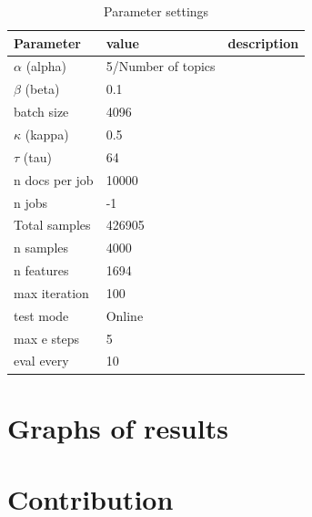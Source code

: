 \begin{table}[h]
\centering
 \begin{tabular}{|l|l| l|} 
 \hline
 Parameter & value & description \\ 
 \hline
 $\alpha$ (alpha) & 5/Number of topics & \\  
 $\beta$ (beta) & 0.1 &\\
 batch size  & 4096 &\\
 $\kappa$ (kappa) & 0.5 &\\
 $\tau$ (tau) & 64 &\\
 n docs per job & 10000&\\
 n jobs & -1 &\\
 Total samples & 426905&\\
 n samples & 4000 &\\
 n features & 1694 & \\
 max iteration & 100 &\\
 test mode & Online &\\
 max e steps & 5 &\\
 eval every & 10 &\\
 \hline
 \end{tabular}
\caption{Parameter settings}
\label{tab:table2}
\end{table}


\section{Graphs of results}

\section{Contribution}\label{results:contribution}


